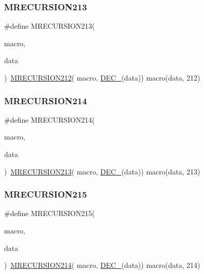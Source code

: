 \subsubsection{\texorpdfstring{MRECURSION213}{MRECURSION213}}
{\footnotesize\ttfamily \#define M\+R\+E\+C\+U\+R\+S\+I\+O\+N213(\begin{DoxyParamCaption}\item[{}]{macro,  }\item[{}]{data }\end{DoxyParamCaption})~\mbox{\hyperlink{group__group__sam0__utils__mrecursion_gad848cc0ac4bd174398a6421a1da308c7}{M\+R\+E\+C\+U\+R\+S\+I\+O\+N212}}(  macro, \mbox{\hyperlink{group__group__sam0__utils__mrecursion_ga1d23d683797679dca8c3512a54a5dcae}{D\+E\+C\+\_\+}}(data))   macro(data, 212)}

\mbox{\label{group__group__sam0__utils__mrecursion_gad5d21c13be81fdbaabdf6dad7968fbd2}} 
\subsubsection{\texorpdfstring{MRECURSION214}{MRECURSION214}}
{\footnotesize\ttfamily \#define M\+R\+E\+C\+U\+R\+S\+I\+O\+N214(\begin{DoxyParamCaption}\item[{}]{macro,  }\item[{}]{data }\end{DoxyParamCaption})~\mbox{\hyperlink{group__group__sam0__utils__mrecursion_ga6889e48b19ed9abc794256617f4b6758}{M\+R\+E\+C\+U\+R\+S\+I\+O\+N213}}(  macro, \mbox{\hyperlink{group__group__sam0__utils__mrecursion_ga1d23d683797679dca8c3512a54a5dcae}{D\+E\+C\+\_\+}}(data))   macro(data, 213)}

\mbox{\label{group__group__sam0__utils__mrecursion_ga5e1d85eb398f85ae49997b1202f36a9a}} 
\subsubsection{\texorpdfstring{MRECURSION215}{MRECURSION215}}
{\footnotesize\ttfamily \#define M\+R\+E\+C\+U\+R\+S\+I\+O\+N215(\begin{DoxyParamCaption}\item[{}]{macro,  }\item[{}]{data }\end{DoxyParamCaption})~\mbox{\hyperlink{group__group__sam0__utils__mrecursion_gad5d21c13be81fdbaabdf6dad7968fbd2}{M\+R\+E\+C\+U\+R\+S\+I\+O\+N214}}(  macro, \mbox{\hyperlink{group__group__sam0__utils__mrecursion_ga1d23d683797679dca8c3512a54a5dcae}{D\+E\+C\+\_\+}}(data))   macro(data, 214)}

